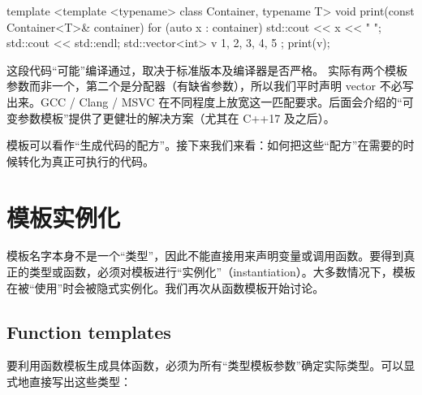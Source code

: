 \begin{code}
template <template <typename> class Container, typename T>
void print(const Container<T>& container) {
  for (auto x : container) { std::cout << x << " "; }
  std::cout << std::endl;
}
std::vector<int> v { 1, 2, 3, 4, 5 };
print(v);
\end{code}

这段代码“可能”编译通过，取决于标准版本及编译器是否严格。 实际有两个模板参数而非一个，第二个是分配器（有缺省参数），所以我们平时声明 vector 不必写出来。GCC / Clang / MSVC 在不同程度上放宽这一匹配要求。后面会介绍的“可变参数模板”提供了更健壮的解决方案（尤其在 C++17 及之后）。

模板可以看作“生成代码的配方”。接下来我们来看：如何把这些“配方”在需要的时候转化为真正可执行的代码。

\section{模板实例化}
模板名字本身不是一个“类型”，因此不能直接用来声明变量或调用函数。要得到真正的类型或函数，必须对模板进行“实例化”（instantiation）。大多数情况下，模板在被“使用”时会被隐式实例化。我们再次从函数模板开始讨论。

\subsection{Function templates}
要利用函数模板生成具体函数，必须为所有“类型模板参数”确定实际类型。可以显式地直接写出这些类型：

